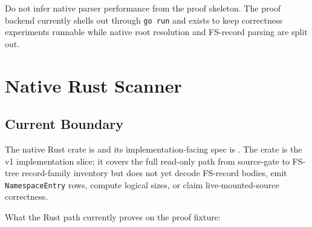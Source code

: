 Do not infer native parser performance from the proof skeleton. The proof backend
currently shells out through \texttt{go run} and exists to keep correctness
experiments runnable while native root resolution and FS-record parsing are
split out.

\section{Native Rust Scanner}

\subsection{Current Boundary}

The native Rust crate is  and its
implementation-facing spec is .
The crate is the v1 implementation slice; it covers the full read-only path
from source-gate to FS-tree record-family inventory but does not yet decode
FS-record bodies, emit \texttt{NamespaceEntry} rows, compute logical sizes, or
claim live-mounted-source correctness.

What the Rust path currently proves on the proof fixture:

